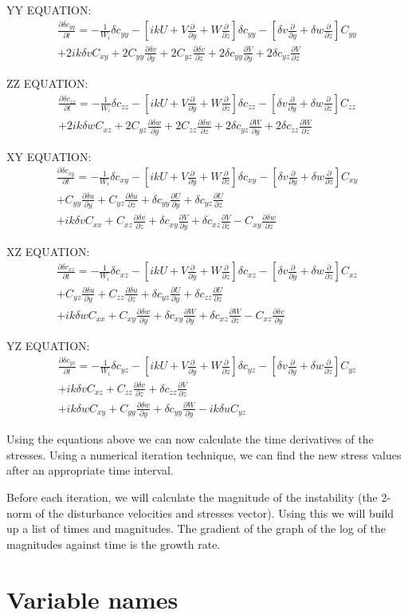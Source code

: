 \documentclass[12pt,a4paper]{article}
\newcommand{\dy}[1]{\frac{\partial #1}{\partial y}}
\newcommand{\dz}[1]{\frac{\partial #1}{\partial z}}
\newcommand{\dt}[1]{\frac{\partial #1}{\partial t}}
\newcommand{\scyy}{\delta c_{yy}}
\newcommand{\sczz}{\delta c_{zz}}
\newcommand{\scxy}{\delta c_{xy}}
\newcommand{\scxz}{\delta c_{xz}}
\newcommand{\scyz}{\delta c_{yz}}
\newcommand{\su}{\delta u}
\newcommand{\sv}{\delta v}
\newcommand{\sw}{\delta w}
\newcommand{\Wi}{\frac{1}{W_{i}}}
\newcommand{\first}[2]{-\Wi \delta c_{#1 #2} - \left[ ikU
+ V\frac{\partial}{\partial y} + W\frac{\partial}{\partial z} \right] \delta c_{#1 #2} 
- \left[ \sv\frac{\partial }{\partial y} + \sw\frac{\partial }{\partial z} \right] C_{#1 #2}}
\begin{document}
\noindent YY EQUATION:
\begin{align}
    \dt{\delta c_{yy}} = \first{y}{y} \nonumber\\
+ 2ik\sv C_{xy} + 2C_{yy}\dy{\sv} + 2C_{yz}\dz{\sv} + 2\scyy \dy{V} + 2\scyz \dz{V}
\end{align}

\noindent ZZ EQUATION:
\begin{align}
    \dt{\delta c_{zz}} = \first{z}{z} \nonumber\\
+ 2ik\sw C_{xz} + 2C_{yz}\dy{\sw} + 2C_{zz}\dz{\sw} + 2\scyz \dy{W} + 2\sczz \dz{W}
\end{align}

\noindent XY EQUATION:
\begin{align}
    \dt{ \delta c_{xy}} = \first{x}{y} \nonumber\\
 + C_{yy}\dy{\su} + C_{yz}\dz{\su} + \scyy \dy{U} + \scyz \dz{U} \nonumber\\
 + ik\sv C_{xx} + C_{xz}\dz{\sv} + \scxy \dy{V} + \scxz \dz{V} - C_{xy}\dz{\sw}
\end{align}

\noindent XZ EQUATION:
\begin{align}
    \dt{ \delta c_{xz}} = \first{x}{z} \nonumber\\
+ C_{yz}\dy{\su} + C_{zz}\dz{\su} + \scyz \dy{U} + \sczz \dz{U} \nonumber\\
+ ik\sw C_{xx} + C_{xy}\dy{\sw} + \scxy \dy{W} + \scxz \dz{W} - C_{xz}\dy{\sv}
\end{align}

\noindent YZ EQUATION:
\begin{align}
    \dt{ \delta c_{yz}} = \first{y}{z} \nonumber\\
+ ik\sv C_{xz} + C_{zz}\dz{\sv} + \sczz \dz{V} \nonumber\\
+ ik\sw C_{xy} + C_{yy}\dy{\sw} + \scyy \dy{W} - ik\su C_{yz}
\end{align}

Using the equations above we can now calculate the time derivatives of the stresses. Using a numerical iteration technique, we can find the new stress values after an appropriate time interval. 

Before each iteration, we will calculate the magnitude of the instability (the 2-norm of the disturbance velocities and stresses vector). Using this we will build up a list of times and magnitudes. The gradient of the graph of the log of the magnitudes against time is the growth rate. 

\section{Variable names}
\end{document}
